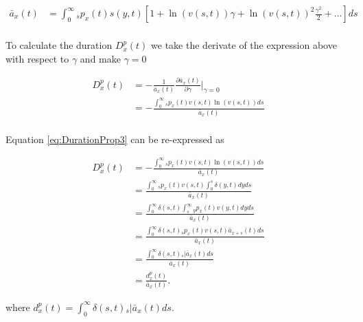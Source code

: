 \documentclass[12pt]{article}
\begin{document}
{\begin{equation}\label{eq:DurationProp2}
\begin{split}
\bar{a}_x(t) &= \int_0^\infty {}_sp_x(t) s(y,t)[1+\ln(v(s,t)) \gamma+{\ln(v(s,t))}^2 \frac{\gamma^2}{2}+...]ds\\
\end{split}
\end{equation}


To calculate the duration ${D}^{p}_{x}(t)$ we take the derivate of the expression above with respect to $\gamma$ and make $\gamma=0$

\begin{equation}\label{eq:DurationProp3}
\begin{split}
{D}^{p}_{x}(t)&=-\frac{1}{\bar{a}_x(t)}\frac{\partial \bar{a}_x(t)}{\partial \gamma} \bigg\rvert_{\gamma=0} \\
&= -\frac{\int_0^\infty {}_sp_x(t) v(s,t) \ln(v(s,t))ds}{\bar{a}_x(t)} \\
\end{split}
\end{equation}


Equation \ref{eq:DurationProp3} can be re-expressed as 


\begin{equation}\label{eq:DurationProp4}
\begin{split}
{D}^{p}_{x}(t) &= -\frac{\int_0^\infty {}_sp_x(t) v(s,t) \ln(v(s,t))ds}{\bar{a}_x(t)}\\
&= \frac{\int_0^\infty {}_sp_x(t) v(s,t) \int_0^{s} \delta(y,t)dy ds }{\bar{a}_x(t)}\\
&= \frac{\int_0^\infty \delta(s,t)  \int_{s}^{\infty} {}_{y}p_x(t) v(y,t)dy ds }{\bar{a}_x(t)}\\
&= \frac{\int_0^\infty \delta(s,t) {}_sp_x(t) v(s,t) \bar{a}_{x+s}(t)  ds }{\bar{a}_x(t)}\\
&= \frac{\int_0^\infty \delta(s,t) {}_s|\bar{a}_x(t) ds}{\bar{a}_x(t)} \\
&= \frac{{d}^{p}_{x}(t)}{\bar{a}_x(t)}.
\end{split}
\end{equation}



where ${d}^{p}_{x}(t)=\int_0^\infty \delta(s,t) {}_s|\bar{a}_x(t) ds$.

\setcounter{figure}{0}
}
\end{document}
